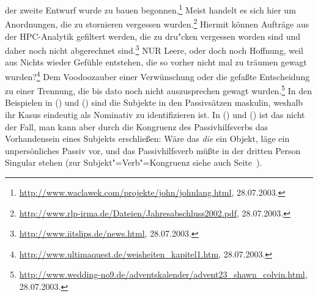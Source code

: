 \eal
\ex\label{bsp-wurde-zu-bauen-begonnen}%
der zweite Entwurf wurde zu bauen begonnen,\footnote{
\url{http://www.waclawek.com/projekte/john/johnlang.html}, 28.07.2003.
}
\zl
\eal
\ex Meist handelt es sich hier um Anordnungen, die zu stornieren vergessen wurden.\footnote{
        \url{http://www.rlp-irma.de/Dateien/Jahresabschluss2002.pdf}, 28.07.2003.
}
\ex Hiermit können Aufträge aus der HPC-Analytik gefiltert werden, die zu dru"cken vergessen worden sind 
    und daher noch nicht abgerechnet sind.\footnote{
        \url{http://www.iitslips.de/news.html}, 28.07.2003.
}
\zl
\eal
\ex NUR Leere, oder doch noch Hoffnung, weil aus Nichts wieder Gefühle entstehen,
    die so vorher nicht mal zu träumen gewagt wurden?\footnote{
        \url{http://www.ultimaquest.de/weisheiten_kapitel1.htm}, 28.07.2003.
}
\ex Dem Voodoozauber einer Verwünschung oder die gefaßte Entscheidung zu einer Trennung,
    die bis dato noch nicht auszusprechen gewagt wurden.\footnote{
        \url{http://www.wedding-no9.de/adventskalender/advent23_shawn_colvin.html}, 28.07.2003.
}
\zl
%
In den Beispielen in () und () sind die Subjekte in den Passivsätzen
maskulin, weshalb ihr Kasus eindeutig als Nominativ zu identifizieren ist. In () und
() ist das nicht der Fall, man kann aber durch die Kongruenz des Passivhilfsverbs
das Vorhandensein eines Subjekts erschließen: Wäre das \emph{die} ein Objekt,
läge ein unpersönliches Passiv vor, und das Passivhilfsverb müßte in der dritten Person
Singular stehen (zur Subjekt"=Verb"=Kongruenz siehe auch Seite~\pageref{bsp-kongruenz-passiv}).

